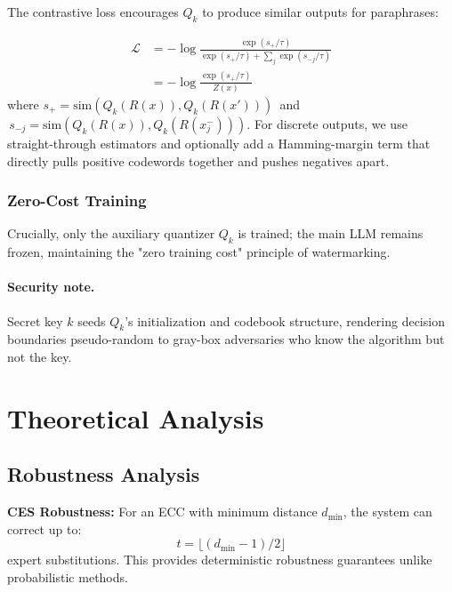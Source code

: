 The contrastive loss encourages $Q_k$ to produce similar outputs for paraphrases:

\begin{align}
\mathcal{L} &= -\log \frac{\exp(s_{+}/\tau)}{\exp(s_{+}/\tau) + \sum_j \exp(s_{-j}/\tau)} \nonumber \\
&= -\log \frac{\exp(s_{+}/\tau)}{Z(x)} \label{eq:contrastive_loss}
\end{align}
where $s_{+} = \text{sim}(Q_k(R(x)), Q_k(R(x')))\,$ and $\,s_{-j} = \text{sim}(Q_k(R(x)), Q_k(R(x_j^-)))$. For discrete outputs, we use straight-through estimators and optionally add a Hamming-margin term that directly pulls positive codewords together and pushes negatives apart.

\subsubsection{Zero-Cost Training}

Crucially, only the auxiliary quantizer $Q_k$ is trained; the main LLM remains frozen, maintaining the "zero training cost" principle of watermarking.

\paragraph{Security note.} Secret key $k$ seeds $Q_k$'s initialization and codebook structure, rendering decision boundaries pseudo-random to gray-box adversaries who know the algorithm but not the key.

\section{Theoretical Analysis}

\subsection{Robustness Analysis}

\textbf{CES Robustness:} For an ECC with minimum distance $d_{\min}$, the system can correct up to:
\begin{equation}
t = \lfloor(d_{\min}-1)/2\rfloor
\end{equation}
expert substitutions. This provides deterministic robustness guarantees unlike probabilistic methods.

